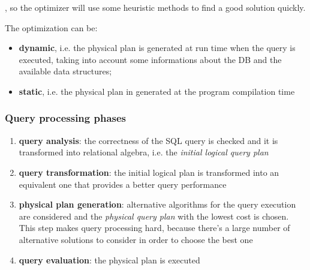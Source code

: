 , so the optimizer will use some heuristic methods to find a good solution quickly.

The optimization can be:
\begin{itemize}
    \item \textbf{dynamic}, i.e. the physical plan is generated at run time when the query is executed, taking into account some informations about the DB and the available data structures;
    \item \textbf{static}, i.e. the physical plan in generated at the program compilation time
\end{itemize}

\subsubsection{Query processing phases}
\begin{enumerate}
    \item \textbf{query analysis}: the correctness of the SQL query is checked and it is transformed into relational algebra, i.e. the \textit{initial logical query plan}
    \item \textbf{query transformation}: the initial logical plan is transformed into an equivalent one that provides a better query performance
    \item \textbf{physical plan generation}: alternative algorithms for the query execution are considered and the \textit{physical query plan} with the lowest cost is chosen. This step makes query processing hard, because there's a large number of alternative solutions to consider in order to choose the best one
    \item \textbf{query evaluation}: the physical plan is executed
\end{enumerate}

